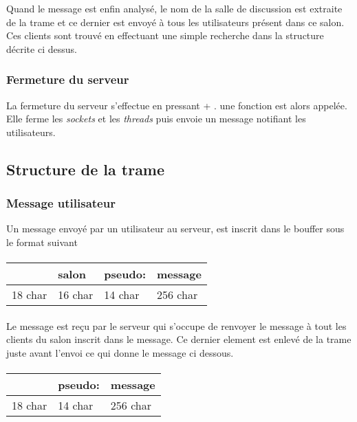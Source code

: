 \documentclass[a4paper, 12pt]{article}
\newcommand{\Touche}[1]{\Ovalbox{#1}}
\begin{document}
Quand le message est enfin analysé, le nom de la salle de discussion est extraite de la trame et ce dernier est envoyé à tous les utilisateurs présent dans ce salon. Ces clients sont trouvé en effectuant une simple recherche dans la structure décrite ci dessus.

\subsubsection{Fermeture du serveur}
La fermeture du serveur s'effectue en pressant \Touche{Ctrl} + \Touche{C}. une fonction est alors appelée. Elle ferme les \emph{sockets} et les \emph{threads} puis envoie un message notifiant les utilisateurs.

\subsection{Structure de la trame}
\subsubsection{Message utilisateur}
Un message envoyé par un utilisateur au serveur, est inscrit dans le bouffer sous le format suivant
\paragraph{}
\begin{tabular}{|p{2cm}|p{1.6cm}|p{1.5cm}|p{5cm}| }
 \hline			
   [hh:mm:ss] & salon & pseudo: & message \\
 \hline		
    18 char & 16 char & 14 char & 256 char \\
 \hline  
 \end{tabular}
 \paragraph{}
Le message est reçu par le serveur qui s'occupe de renvoyer le message à tout les clients du salon inscrit dans le message.
Ce dernier element est enlevé de la trame juste avant l'envoi ce qui donne le message ci dessous.
\paragraph{}
 \begin{tabular}{|p{2cm}|p{1.5cm}|p{5cm}| }
  \hline			
    [hh:mm:ss] & pseudo: & message \\
  \hline		
     18 char & 14 char & 256 char \\
  \hline  
  \end{tabular}
\end{document}
